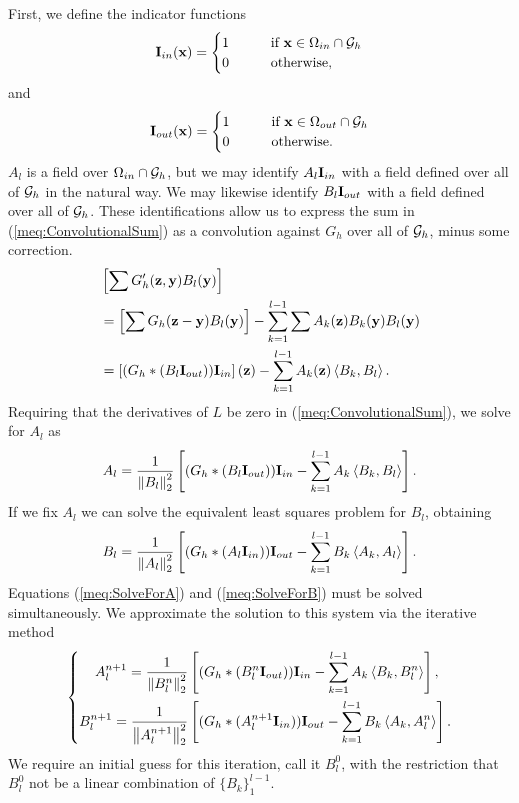 First, we define the indicator functions
\begin{equation}
\mathbf{\mathbf{I}}_{in}(\mathbf{x}) = \begin{cases}
1 \qquad &\text{if $\mathbf{x} \in \Omega_{in}\cap\mathcal{G}_h$} \\
0 \qquad &\text{otherwise}, \end{cases}
\end{equation}
and
\begin{equation}
\mathbf{\mathbf{I}}_{out}(\mathbf{x}) = \begin{cases}
1 \qquad &\text{if $\mathbf{x} \in \Omega_{out}\cap\mathcal{G}_h$} \\
0 \qquad &\text{otherwise}. \end{cases}
\end{equation}
$A_l$ is a field over $\Omega_{in}\cap\mathcal{G}_h$, but we may identify $A_l\mathbf{\mathbf{I}}_{in}$ with a field defined over all of $\mathcal{G}_h$ in the natural way. We may likewise identify $B_l\mathbf{\mathbf{I}}_{out}$ with a field defined over all of $\mathcal{G}_h$. These identifications allow us to express the sum in (\ref{meq:ConvolutionalSum}) as a convolution against $G_h$ over all of $\mathcal{G}_h$, minus some correction.
\begin{align}
&\left[ \sum G_h'(\mathbf{z},\mathbf{y})B_l(\mathbf{y}) \right] \nonumber \\
&= 
\left[ \sum G_h(\mathbf{z} - \mathbf{y})B_l(\mathbf{y}) \right] -
\sum_{k = 1}^{l-1} \sum A_k(\mathbf{z}) B_k(\mathbf{y}) B_l(\mathbf{y}) \\
&=
\left[(G_h*(B_l\mathbf{I}_{out}))\mathbf{I}_{in}\right](\mathbf{z}) -
\sum_{k = 1}^{l-1} A_k(\mathbf{z}) \left\langle B_k, B_l \right\rangle. \nonumber
\end{align}
Requiring that the derivatives of $L$ be zero in (\ref{meq:ConvolutionalSum}), we solve for $A_l$ as
\begin{equation}
A_l = \frac{1}{\left\lVert B_l\right\rVert_2^2}
\left[
(G_h*(B_l\mathbf{I}_{out}))\mathbf{I}_{in}
- \sum_{k = 1}^{l-1} A_k \left\langle B_k, B_l \right\rangle
\right].
\label{meq:SolveForA}
\end{equation}
If we fix $A_l$ we can solve the equivalent least squares problem for $B_l$, obtaining
\begin{equation}
B_l = \frac{1}{\left\lVert A_l\right\rVert_2^2}
\left[
(G_h*(A_l\mathbf{I}_{in}))\mathbf{I}_{out}
- \sum_{k = 1}^{l-1} B_k \left\langle A_k, A_l \right\rangle
\right].
\label{meq:SolveForB}
\end{equation}
Equations (\ref{meq:SolveForA}) and (\ref{meq:SolveForB}) must be solved simultaneously. We approximate the solution to this system via the iterative method
\begin{equation}
\left\{
\begin{aligned}
A_l^{n+1} = \frac{1}{\left\lVert B_l^n\right\rVert_2^2}
&\left[
(G_h*(B_l^n\mathbf{I}_{out}))\mathbf{I}_{in}
- \sum_{k = 1}^{l-1} A_k \left\langle B_k, B_l^n \right\rangle
\right], \\
B_l^{n+1} = \frac{1}{\left\lVert A_l^{n+1}\right\rVert_2^2}
&\left[
(G_h*(A_l^{n+1}\mathbf{I}_{in}))\mathbf{I}_{out}
- \sum_{k = 1}^{l-1} B_k \left\langle A_k, A_l^n \right\rangle
\right].
\label{meq:PowerMethod}
\end{aligned}
\right.
\end{equation}
We require an initial guess for this iteration, call it $B_l^0$, with the restriction that $B_l^0$ not be a linear combination of $\{B_k\}_1^{l-1}$.

